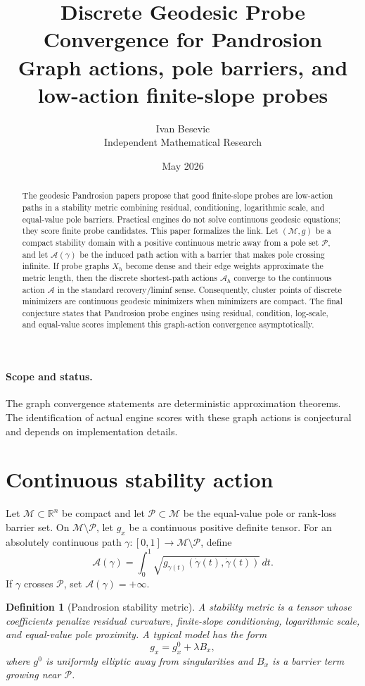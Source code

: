 \documentclass[11pt]{article}
\title{Discrete Geodesic Probe Convergence for Pandrosion\\[3pt]
\large Graph actions, pole barriers, and low-action finite-slope probes}
\author{Ivan Besevic\\Independent Mathematical Research}
\date{May 2026}
\newtheorem{definition}{Definition}[section]
\newcommand{\R}{\mathbb R}
\newcommand{\A}{\mathcal A}
\newcommand{\M}{\mathcal M}
\newcommand{\Pset}{\mathcal P}
\begin{document}
\maketitle

\begin{abstract}
The geodesic Pandrosion papers propose that good finite-slope probes are low-action paths in a stability metric combining residual, conditioning, logarithmic scale, and equal-value pole barriers. Practical engines do not solve continuous geodesic equations; they score finite probe candidates. This paper formalizes the link. Let \((\M,g)\) be a compact stability domain with a positive continuous metric away from a pole set \(\Pset\), and let \(\A(\gamma)\) be the induced path action with a barrier that makes pole crossing infinite. If probe graphs \(X_h\) become dense and their edge weights approximate the metric length, then the discrete shortest-path actions \(\A_h\) converge to the continuous action \(\A\) in the standard recovery/liminf sense. Consequently, cluster points of discrete minimizers are continuous geodesic minimizers when minimizers are compact. The final conjecture states that Pandrosion probe engines using residual, condition, log-scale, and equal-value scores implement this graph-action convergence asymptotically.
\end{abstract}

\paragraph{Scope and status.}
The graph convergence statements are deterministic approximation theorems. The identification of actual engine scores with these graph actions is conjectural and depends on implementation details.

\section{Continuous stability action}

Let \(\M\subset\R^n\) be compact and let \(\Pset\subset\M\) be the equal-value pole or rank-loss barrier set. On \(\M\setminus\Pset\), let \(g_x\) be a continuous positive definite tensor. For an absolutely continuous path \(\gamma:[0,1]\to\M\setminus\Pset\), define
\[
        \A(\gamma)=\int_0^1\sqrt{g_{\gamma(t)}(\dot\gamma(t),\dot\gamma(t))}\,dt.
\]
If \(\gamma\) crosses \(\Pset\), set \(\A(\gamma)=+\infty\).

\begin{definition}[Pandrosion stability metric]
A stability metric is a tensor whose coefficients penalize residual curvature, finite-slope conditioning, logarithmic scale, and equal-value pole proximity. A typical model has the form
\[
        g_x=g_x^{0}+\lambda B_x,
\]
where \(g^0\) is uniformly elliptic away from singularities and \(B_x\) is a barrier term growing near \(\Pset\).
\end{definition}
\end{document}
